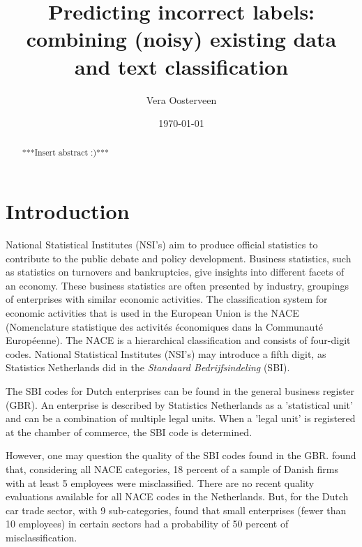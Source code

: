 \documentclass[12pt, a4paper, titlepage]{article}
\begin{document}
\title{Predicting incorrect labels: combining (noisy) existing data and text classification}
\author{Vera Oosterveen \\   }
\date{\today}
\maketitle

							\begin{abstract}
							***Insert abstract :)***
							\end{abstract}


							\section{Introduction}
							\label{section:intro}

National Statistical Institutes (NSI’s) aim to produce official statistics to contribute to the public debate and policy development. Business statistics, such as statistics on turnovers and bankruptcies, give insights into different facets of an economy. These business statistics are often presented by industry, groupings of enterprises with similar economic activities. The classification system for economic activities that is used in the European Union is the NACE (Nomenclature statistique des activités économiques dans la Communauté Européenne). The NACE is a hierarchical classification and consists of four-digit codes. National Statistical Institutes (NSI’s) may introduce a fifth digit, as Statistics Netherlands did in the \textit{Standaard Bedrijfsindeling} (SBI).

The SBI codes for Dutch enterprises can be found in the general business register (GBR). An enterprise is described by Statistics Netherlands as a 'statistical unit' and can be a combination of multiple legal units. When a 'legal unit' is registered at the chamber of commerce, the SBI code is determined. 

However, one may question the quality of the SBI codes found in the GBR. \citet{Christensen2008} found that, considering all NACE categories, 18 percent of a sample of Danish firms with at least 5 employees were misclassified. There are no recent quality evaluations available for all NACE codes in the Netherlands. But, for the Dutch car trade sector, with 9 sub-categories, \citet{DeldenScholtusBurger} found that small enterprises (fewer than 10 employees) in certain sectors had a probability of 50 percent of misclassification.
\end{document}
